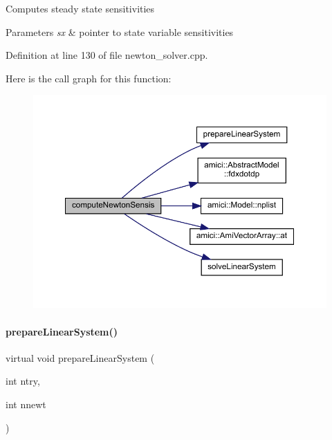 Computes steady state sensitivities


\begin{DoxyParams}{Parameters}
{\em sx} & pointer to state variable sensitivities\\
\hline
\end{DoxyParams}


Definition at line 130 of file newton\+\_\+solver.\+cpp.

Here is the call graph for this function\+:
\nopagebreak
\begin{figure}[H]
\begin{center}
\leavevmode
\includegraphics[width=350pt]{classamici_1_1_newton_solver_a90d4823c7b8373d9aaccba80c930a7c7_cgraph}
\end{center}
\end{figure}
\mbox{\label{classamici_1_1_newton_solver_a4aed46b0343374f171f9b4b51fa009e7}} 
\paragraph{\texorpdfstring{prepareLinearSystem()}{prepareLinearSystem()}}
{\footnotesize\ttfamily virtual void prepare\+Linear\+System (\begin{DoxyParamCaption}\item[{int}]{ntry,  }\item[{int}]{nnewt }\end{DoxyParamCaption})\hspace{0.3cm}{\ttfamily [pure virtual]}}

